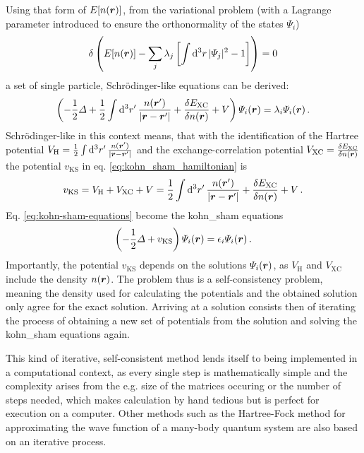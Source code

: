 \documentclass[main.tex]{subfiles}
\begin{document}
Using that form of \(E[n(\vb*{r})]\), from the variational problem (with a Lagrange parameter introduced to ensure the orthonormality of the states \(\Psi_i\))
\begin{align}
     \delta \left( E [n(\vb*{r})] - \sum_j \lambda_j \left[\int \dd[3]{r} \vert \Psi_j \vert^2 - 1 \right] \right) = 0
\end{align}
a set of single particle, Schrödinger-like equations can be derived:
\begin{equation}\label{eq:kohn-sham-equations}
    \left(-\frac{1}{2} \Delta + \frac{1}{2} \int \dd[3]{r^{\prime}} \frac{n(\vb*{r}^{\prime})}{\vert \vb*{r} - \vb*{r}^{\prime} \vert} + \fdv{E_{\mathrm{XC}}}{n(\vb*{r})} + V\right) \Psi_i (\vb*{r}) = \lambda_i \Psi_i (\vb*{r})\,.
\end{equation}
Schrödinger-like in this context means, that with the identification of the Hartree potential \(V_{\mathrm{H}} = \frac{1}{2} \int \dd[3]{r^{\prime}} \frac{n(\vb*{r}^{\prime})}{\vert \vb*{r} - \vb*{r}^{\prime} \vert}\) and the exchange-correlation potential \(V_{\mathrm{XC}} = \fdv{E_{\mathrm{XC}}}{n(\vb*{r})}\) the potential \(v_{\mathrm{KS}}\) in eq. \ref{eq:kohn_sham_hamiltonian} is
\begin{equation}
    v_{\mathrm{KS}} =  V_{\mathrm{H}} + V_{\mathrm{XC}} + V = \frac{1}{2} \int \dd[3]{r^{\prime}} \frac{n(\vb*{r}^{\prime})}{\vert \vb*{r} - \vb*{r}^{\prime} \vert} + \fdv{E_{\mathrm{XC}}}{n(\vb*{r})} + V\,.
\end{equation}
Eq. \ref{eq:kohn-sham-equations} become the \acrshort{kohn_sham} equations
\begin{equation}
    \left(- \frac{1}{2} \Delta + v_{\mathrm{KS}}\right) \Psi_i (\vb*{r}) = \epsilon_i \Psi_i (\vb*{r})\,.
\end{equation}
Importantly, the potential \(v_{\mathrm{KS}}\) depends on the solutions \(\Psi_i (\vb*{r})\), as \(V_{\mathrm{H}}\) and \(V_{\mathrm{XC}}\) include the density \(n(\vb*{r})\).
The problem thus is a self-consistency problem, meaning the density used for calculating the potentials and the obtained solution only agree for the exact solution.
Arriving at a solution consists then of iterating the process of obtaining a new set of potentials from the solution and solving the \acrshort{kohn_sham} equations again.

This kind of iterative, self-consistent method lends itself to being implemented in a computational context, as every single step is mathematically simple and the complexity arises from the e.g. size of the matrices occuring or the number of steps needed, which makes calculation by hand tedious but is perfect for execution on a computer.
Other methods such as the Hartree-Fock method for approximating the wave function of a many-body quantum system are also based on an iterative process.
\end{document}
